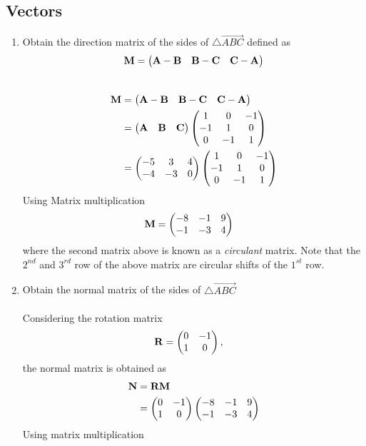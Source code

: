 \documentclass[10pt]{book}
\begin{document}
\subsection{Vectors}
\begin{enumerate}[label=\thesubsection.\arabic*.,ref=\thesubsection.\theenumi]
\item Obtain the direction matrix of the sides of $\triangle \vec{ABC}$ defined as 
\begin{align}
\mathbf{M} = 	\begin{pmatrix}\mathbf{A}-\mathbf{B} & \mathbf{B}-\mathbf{C} & \mathbf{C}-\mathbf{A}\end{pmatrix}
\end{align}
\\
\solution 
\begin{align}
\mathbf{M} &= \begin{pmatrix}\mathbf{A}-\mathbf{B} & \mathbf{B}-\mathbf{C} & \mathbf{C}-\mathbf{A}\end{pmatrix} \\
	&= \begin{pmatrix}\mathbf{A} & \mathbf{B} &\mathbf{C}\end{pmatrix} \begin{pmatrix}1 & 0 & -1 \\ -1 & 1 & 0 \\ 0 & -1 & 1\end{pmatrix} \\
 &=\begin{pmatrix}-5 & 3 & 4 \\ -4 & -3 & 0\end{pmatrix}\begin{pmatrix}1 & 0 & -1 \\ -1 & 1 & 0 \\ 0 & -1 & 1\end{pmatrix} 
 \end{align}
 Using Matrix multiplication 
 \begin{align}
 \mathbf{M} &=\begin{pmatrix}-8 & -1 & 9 \\ -1 & -3 & 4\end{pmatrix}
\end{align}
where the second matrix above is known as a {\em circulant} matrix.  Note that the $2^{nd}$ and $3^{rd}$ row of the above matrix are circular shifts of the $1^{st}$ row.
\item Obtain the normal matrix  of the sides of $\triangle \vec{ABC}$ \\
\solution\\
Considering the rotation matrix
\begin{align}
\mathbf{R} &= \begin{pmatrix}0 & -1 \\ 1 & 0\end{pmatrix},
\end{align}
the normal matrix is obtained as
\begin{align}
\mathbf{N} &= \mathbf{R}\mathbf{M} \\
&=\begin{pmatrix}0 & -1 \\ 1 & 0\end{pmatrix}\begin{pmatrix}-8 & -1 & 9 \\ -1 & -3 & 4\end{pmatrix} 
\end{align}
Using matrix multiplication 
\begin{align}

\end{align}
\end{enumerate}
\end{document}
